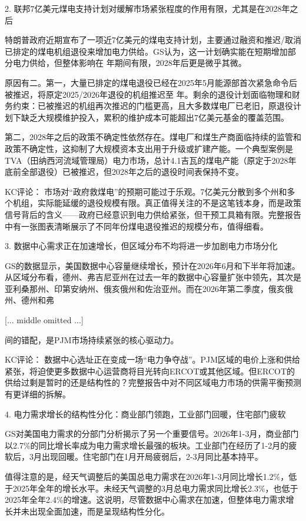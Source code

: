 \documentclass[11pt]{ctexart}
\begin{document}
2. 联邦7亿美元煤电支持计划对缓解市场紧张程度的作用有限，尤其是在2028年之后

特朗普政府近期宣布了一项近7亿美元的煤电支持计划，主要通过融资和推迟/取消已排定的煤电机组退役来增加电力供给。GS认为，这一计划确实能在短期增加部分电力供给，但整体影响在 年期间有限，2028年后更是微乎其微。

原因有二。第一，大量已排定的煤电退役已经在2025年5月能源部首次紧急命令后被推迟，将原定2025/2026年退役的机组推迟至 年。剩余的退役计划面临物理和财务约束：已被推迟的机组再次推迟的门槛更高，且大多数煤电厂已老旧，原退役计划下缺乏大规模维护投入，累积的维护成本可能超出7亿美元基金的覆盖范围。

第二，2028年之后的政策不确定性依然存在。煤电厂和煤生产商面临持续的监管和政策不确定性，这抑制了大规模资本支出用于升级或扩建产能。一个典型案例是TVA（田纳西河流域管理局）电力市场，总计4.1吉瓦的煤电产能（原定于2028年底前全部退役）已被推迟，但2028年之后的退役时间表保持不变。

KC评论： 市场对“政府救煤电”的预期可能过于乐观。7亿美元分散到多个州和多个机组，实际能延缓的退役规模有限。真正值得关注的不是这笔钱本身，而是政策信号背后的含义——政府已经意识到电力供给紧张，但干预工具箱有限。完整报告中有一张图表清晰展示了不同年份煤电退役推迟的规模分布，值得细看。

3. 数据中心需求正在加速增长，但区域分布不均将进一步加剧电力市场分化

GS的数据显示，美国数据中心容量继续增长，预计在2026年6月和下半年将加速。从区域分布看，德州、弗吉尼亚州在过去一年的数据中心容量扩张中领先，其次是亚利桑那州、印第安纳州、俄亥俄州和佐治亚州。而在2026年第二季度，俄亥俄州、德州和弗

[... middle omitted ...]

间的错配，是PJM市场持续紧张的核心驱动力。

KC评论： 数据中心选址正在变成一场“电力争夺战”。PJM区域的电价上涨和供给紧张，将迫使更多数据中心运营商将目光转向ERCOT或其他区域。但ERCOT的供给过剩是暂时的还是结构性的？完整报告中对不同区域电力市场的供需平衡预测有更详细的拆解。

4. 电力需求增长的结构性分化：商业部门领跑，工业部门回暖，住宅部门疲软

GS对美国电力需求的分部门分析揭示了另一个重要信号。2026年1-3月，商业部门以2.7\%的同比增长率成为电力需求增长最强的板块。工业部门在经历了1-2月的疲软后，3月出现回暖。住宅部门在1月开局疲弱后，2-3月同比基本持平。

值得注意的是，经天气调整后的美国总电力需求在2026年1-3月同比增长1.2\%，低于2025年全年的增长水平。未经天气调整的3月总电力需求同比增长2.3\%，也低于2025年全年2.4\%的增速。这说明，尽管数据中心需求在加速，但整体电力需求增长并未出现全面加速，而是呈现结构性分化。
\end{document}
